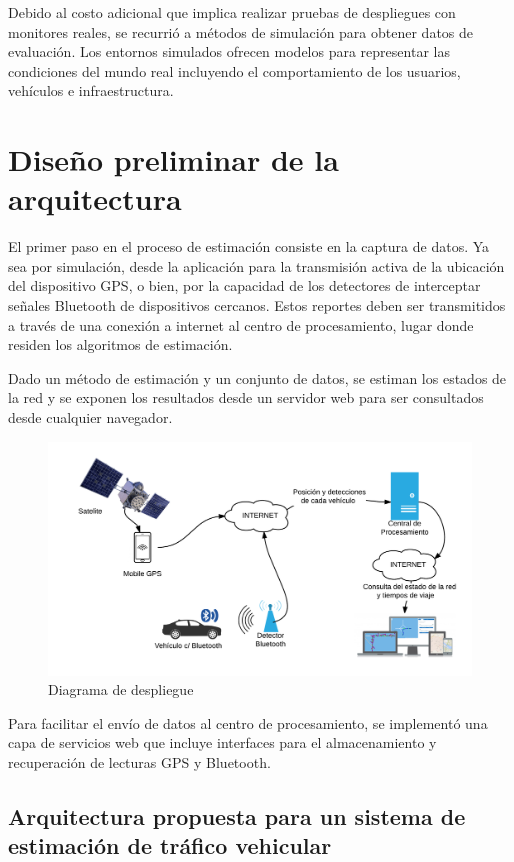 Debido al costo adicional que implica realizar pruebas de despliegues con monitores reales, se recurrió a métodos de simulación para obtener datos de evaluación. Los entornos simulados ofrecen modelos para representar las condiciones del mundo real incluyendo el comportamiento de los usuarios, vehículos e infraestructura.

\section{Diseño preliminar de la arquitectura}

El primer paso en el proceso de estimación consiste en la captura de datos. Ya sea por simulación, desde la aplicación para la transmisión activa de la ubicación del dispositivo GPS, o bien, por la capacidad de los detectores de interceptar señales Bluetooth de dispositivos cercanos. Estos reportes deben ser transmitidos a través de una conexión a internet al centro de procesamiento, lugar donde residen los algoritmos de estimación.

Dado un método de estimación y un conjunto de datos, se estiman los estados de la red y se exponen los resultados desde un servidor web para ser consultados desde cualquier navegador.

\begin{figure}[!htp]
	\centering
	\includegraphics[scale=0.9]{images/deployment.png}
	\caption{Diagrama de despliegue}
    \label{fig:deployment}
\end{figure}

Para facilitar el envío de datos al centro de procesamiento, se implementó una capa de servicios web que incluye interfaces para el almacenamiento y recuperación de lecturas GPS y Bluetooth.

\subsection{Arquitectura propuesta para un sistema de estimación de tráfico vehicular}

